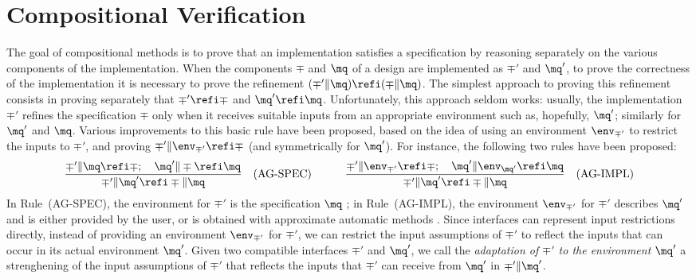 \section{Compositional Verification} 

The goal of compositional methods is to prove that an implementation
satisfies a specification by reasoning separately on the various
components of the implementation. 
When the components $\mp$ and $\mq$ of a design are implemented as
$\mp'$ and $\mq'$, to prove the correctness of the implementation it
is necessary to prove the refinement $(\mp' \| \mq) \refi (\mp \| \mq)$.
The simplest approach to proving this refinement consists in proving
separately that $\mp' \refi \mp$ and $\mq' \refi \mq$. 
Unfortunately, this approach seldom works: usually, the
implementation $\mp'$ refines the specification $\mp$ only 
when it receives suitable inputs from an 
appropriate environment such as, hopefully, $\mq'$;
similarly for $\mq'$ and $\mq$. 
Various improvements to this basic rule have been proposed, based on
the idea of using an environment $\env_{\mp'}$ to restrict the inputs
to $\mp'$, and proving $\mp' \| \env_{\mp'} \refi \mp$ (and
symmetrically for $\mq'$). 
For instance, the following two rules have been proposed: 
\[
  \frac{\mp' \| \mq \refi \mp; \hspace{1em} \mq' \| \mp \refi \mq}{%
	\mp' \| \mq' \refi \mp \| \mq} \hspace{1em} (\mbox{\rm AG-SPEC})
  \hspace{3em} 
  \frac{\mp' \| \env_{\mp'} \refi \mp; \hspace{1em} 
	\mq' \| \env_{\mq'} \refi \mq}{%
	\mp' \| \mq' \refi \mp \| \mq} \hspace{1em} (\mbox{\rm AG-IMPL})
\]
In Rule~(AG-SPEC), the environment for $\mp'$ is the specification
$\mq$ \cite{RM96journal,FMCAD98}; 
in Rule~(AG-IMPL), the environment $\env_{\mp'}$ for $\mp'$ describes 
$\mq'$ and is either provided by the user, or is obtained 
with approximate automatic methods \cite{concur99freddy}. 
Since interfaces can represent input restrictions directly, instead of
providing an environment $\env_{\mp'}$ for $\mp'$, we can restrict the
input assumptions of $\mp'$ to reflect the inputs that can occur in
its actual environment $\mq'$. 
Given two compatible interfaces $\mp'$ and $\mq'$, we call the 
{\em adaptation of $\mp'$ to the environment $\mq'$\/}
a strenghening of the input assumptions of $\mp'$ that reflects the
inputs that $\mp'$ can receive from $\mq'$ in $\mp'\|\mq'$. 

